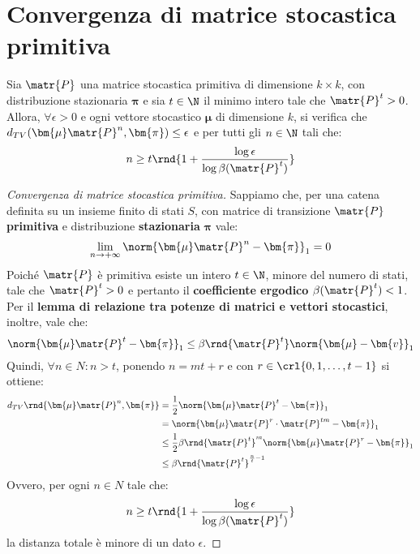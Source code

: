 \documentclass[\main/main.tex]{subfiles}
\begin{document}
\section{Convergenza di matrice stocastica primitiva}
\begin{theorem}
  Sia \(\matr{P}\) una matrice stocastica primitiva di dimensione \(k \times k\), con distribuzione stazionaria \(\bm{\pi} \) e sia \(t \in \N \) il minimo intero tale che \(\matr{P}^t > 0\). Allora, \(\forall \epsilon > 0\) e ogni vettore stocastico \(\bm{\mu} \) di dimensione \(k\), si verifica che \(d_{TV}(\bm{\mu}\matr{P}^n, \bm{\pi}) \leq \epsilon \) e per tutti gli \(n \in \N \) tali che:
  \[
    n \geq t\rnd{1+\frac{\log \epsilon}{\log \beta(\matr{P}^t)}}
  \]
\end{theorem}
\begin{proof}[Convergenza di matrice stocastica primitiva]
  Sappiamo che, per una catena definita su un insieme finito di stati \(S\), con matrice di transizione \(\matr{P}\) \textbf{primitiva} e distribuzione \textbf{stazionaria} \(\bm{\pi} \) vale:
  \[
    \lim_{n\rightarrow +\infty} \norm{\bm{\mu} \matr{P}^n - \bm{\pi}}_1 = 0
  \]
  Poiché \(\matr{P}\) è primitiva esiste un intero \(t \in \N \), minore del numero di stati, tale che \(\matr{P}^t > 0\) e pertanto il \textbf{coefficiente ergodico} \(\beta(\matr{P}^t) < 1\). Per il \textbf{lemma di relazione tra potenze di matrici e vettori stocastici}, inoltre, vale che:
  \[
    \norm{\bm{\mu}\matr{P}^t - \bm{\pi}}_1 \leq \beta\rnd{\matr{P}^t} \norm{\bm{\mu} - \bm{v}}_1
  \]
  Quindi, \(\forall n \in N: n > t\), ponendo \(n = mt + r\) e con \(r \in \crl{0, 1, \ldots, t-1}\) si ottiene:
  \begin{align*}
    d_{TV}\rnd{\bm{\mu}\matr{P}^n, \bm{\pi}} & = \frac{1}{2}\norm{\bm{\mu}\matr{P}^t - \bm{\pi}}_1                            \\
                                             & = \norm{\bm{\mu}\matr{P}^r\cdot\matr{P}^{tm} - \bm{\pi}}_1                     \\
                                             & \leq \frac{1}{2}\beta\rnd{\matr{P}^t}^m \norm{\bm{\mu}\matr{P}^r - \bm{\pi}}_1 \\
                                             & \leq \beta\rnd{\matr{P}^t}^{\frac{n}{t}-1}
  \end{align*}
  Ovvero, per ogni \(n \in N\) tale che:
  \[
    n \geq t\rnd{1+\frac{\log \epsilon}{\log \beta(\matr{P}^t)}}
  \]
  la distanza totale è minore di un dato \(\epsilon \).
\end{proof}
\end{document}
